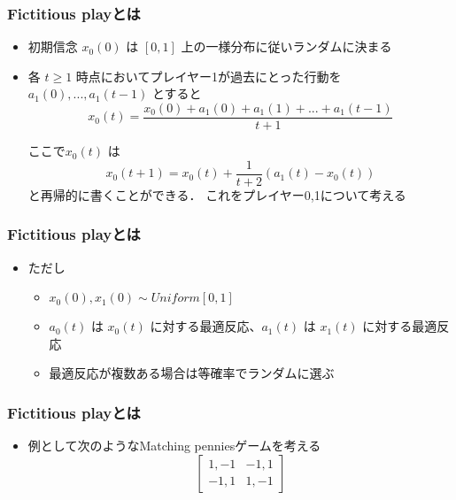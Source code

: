 \documentclass[dvipdfmx,fleqn,handout]{beamer}
\begin{document}
\begin{frame}\frametitle{Fictitious playとは}
 \begin{itemize}\setlength{\parskip}{0.5em}
  \item
  初期信念 $x_{0}(0)$ は $[0,1]$ 上の一様分布に従いランダムに決まる
  \item
  各 $t \geq 1$ 時点においてプレイヤー1が過去にとった行動を $a_{1}(0),...,a_{1}(t-1)$ とすると
  \[
  x_{0}(t)
  = \frac{x_{0}(0) + a_{1}(0) + a_{1}(1) + ... + a_{1}(t-1)}{t + 1}
  \]

  ここで$x_{0}(t)$ は
  \[
  x_0(t+1)
  = x_0(t) + \frac{1}{t+2} (a_1(t) - x_0(t))
  \]
  と再帰的に書くことができる．
  これをプレイヤー0,1について考える
 \end{itemize}
\end{frame}


\begin{frame}\frametitle{Fictitious playとは}
 \begin{itemize}\setlength{\parskip}{0.5em}
  \item
  ただし
   \begin{itemize}\setlength{\parskip}{0.5em}
    \item
    $x_{0}(0),x_{1}(0) \sim Uniform[0,1]$
    \item
    $a_{0}(t)$ は $x_{0}(t)$ に対する最適反応、$a_{1}(t)$ は $x_{1}(t)$ に対する最適反応
    \item
    最適反応が複数ある場合は等確率でランダムに選ぶ
   \end{itemize}
 \end{itemize}
\end{frame}


\begin{frame}\frametitle{Fictitious playとは}
 \begin{itemize}\setlength{\parskip}{0.5em}
  \item
  例として次のようなMatching penniesゲームを考える
  \[
    \left[
     \begin{array}{rrr}
       1,-1 & -1,1 \\
       -1,1 & 1,-1
     \end{array}
    \right]
  \]
 \end{itemize}
\end{frame}
\end{document}
